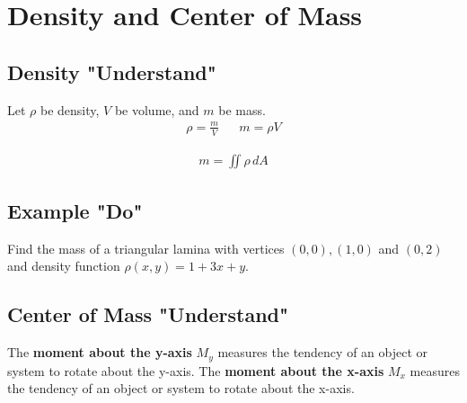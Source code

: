 \documentclass[11pt,letterpaper]{article}
\newif\ifshowsolutions
\newcommand{\sol}[1]{%
  \ifshowsolutions
  {\color{red}#1}%
  \fi
}
\begin{document}
\vfill


\newpage

\section{Density and Center of Mass}
\subsection{Density "Understand"}

Let $\rho $ be density, $V$ be volume, and $m$ be mass.
\begin{align*}
    \rho= \frac{m}{V} && m=\rho V
\end{align*}

\vfill 
{\color{red}
\begin{align*}
    m=\iint \rho \, dA
\end{align*}}


\subsection{Example "Do"}
Find the mass of a triangular lamina with vertices $(0,0),(1,0)$ and $(0,2)$ and density function $\rho(x,y)=1+3x+y$.

\sol{%
\textbf{Solution.}
\textbf{Step 1 (describe the triangle).}
The segment from $(1,0)$ to $(0,2)$ is $y=2-2x$. For $0\le x\le 1$, $0\le y\le 2-2x$.

\textbf{Step 2 (mass integral).}
\[
m=\int_0^1\int_0^{2-2x}(1+3x+y)\,dy\,dx.
\]

\textbf{Step 3 (inner integral).}
\[
\int_0^{2-2x}(1+3x+y)\,dy
=(1+3x)y+\frac{y^2}{2}\Big|_0^{2-2x}
=(1+3x)(2-2x)+\frac{(2-2x)^2}{2}.
\]
Expand: $(1+3x)(2-2x)=2+4x-6x^2$ and $\dfrac{(2-2x)^2}{2}=2(1-x)^2=2-4x+2x^2$, so the sum is $4-4x^2$.

\textbf{Step 4 (outer integral).}
\[
m=\int_0^1(4-4x^2)\,dx
=\left[4x-\frac{4x^3}{3}\right]_0^1
=4-\frac{4}{3}
=\boxed{\frac{8}{3}}.
\]
}

\vfill 
\pagebreak

\subsection{Center of Mass "Understand"}

The \textbf{moment about the y-axis} $M_y$ measures the tendency of an object or system to rotate about the y-axis. The \textbf{moment about the x-axis} $M_x$ measures the tendency of an object or system to rotate about the x-axis.
\end{document}
